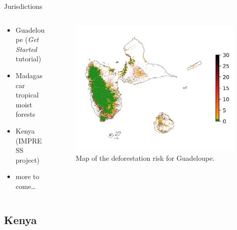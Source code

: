 \documentclass[10pt,table,dvipsnames,compress]{beamer}
\begin{document}
\begin{frame}[label={sec:org40df261}]{Jurisdictions}
\begin{columns}
\begin{column}{0.5\columnwidth}
\begin{itemize}
\item Guadeloupe (\emph{Get Started} tutorial)
\item Madagascar tropical moist forests
\item Kenya (IMPRESS project)
\item more to come\ldots{}
\end{itemize}
\end{column}

\begin{column}{0.5\columnwidth}
\begin{figure}[htbp]
\centering
\includegraphics[width=\textwidth]{figs/riskmap_ws5_ei.png}
\caption{\label{fig:org921de52}Map of the deforestation risk for Guadeloupe.}
\end{figure}
\end{column}
\end{columns}
\end{frame}

\subsection{Kenya}
\label{sec:orgeb53768}
\end{document}
